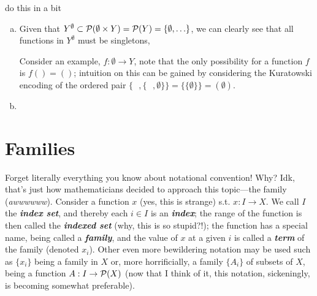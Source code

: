 \documentclass{report}
\begin{document}
\sol do this in a bit

\sol {}
{\begin{enumerate}[a)]
    \item Given that \( Y^{\emptyset} \subset \mathcal{P} (\emptyset \times Y) = \mathcal{P}(Y)=\{\emptyset,\ldots   \}\), we can clearly see that all functions in \( Y^{\emptyset} \) must be singletons, 




      Consider an example, \( f : \emptyset \to Y \), note that the only possibility for a function \( f \) is \( f()=() \); intuition on this can be gained by considering the Kuratowski encoding of the ordered pair \( \{ \text{  }, \{ \text{  }, \emptyset\}  \}= \{\{\emptyset\}  \} =(\emptyset)\). 


      
    \item 
\end{enumerate}}


\section{Families}

Forget literally everything you know about notational convention! Why? Idk, that's just how mathematicians decided to approach this topic---the family (\textit{awwwwww}). Consider a function \( x \) (yes, this is strange) s.t. \( x : I \to  X \). We call \( I \) the \textbf{\textit{index set}}, and thereby each \( i \in  I \) is an \textbf{\textit{index}}; the range of the function is then called the \textbf{\textit{indexed set}} (why, this is so stupid?!); the function has a special name, being called a \textbf{\textit{family}}, and the value of \( x \) at a given \( i \) is called a \textbf{\textit{term}} of the family (denoted \( x_{i} \)). Other even more bewildering notation may be used such as \( \{x_{i}\}   \) being a family in \( X \) or, more horrificially, a family \( \{A_i\}   \) of subsets of \( X \), being a function \( A : I \to  \mathcal{P}(X)\) (now that I think of it, this notation, sickeningly, is becoming somewhat preferable). 
\end{document}
